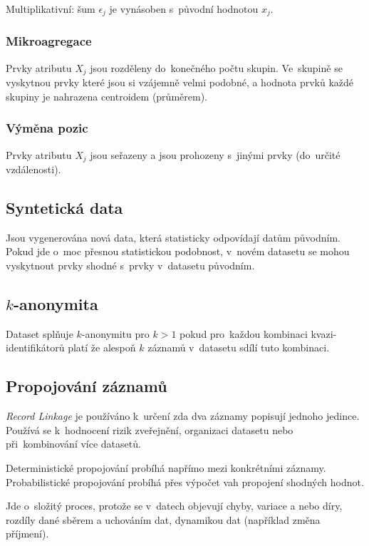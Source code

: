 Multiplikativní: šum $\epsilon_j$ je vynásoben s~původní hodnotou $x_j$.


\subsubsection*{Mikroagregace}

Prvky atributu $X_j$ jsou rozděleny do~konečného počtu skupin.
Ve~skupině se vyskytnou prvky které jsou si vzájemně velmi podobné, a hodnota prvků každé skupiny je nahrazena centroidem (průměrem).


\subsubsection*{Výměna pozic}


Prvky atributu $X_j$ jsou seřazeny a jsou prohozeny s~jinými prvky (do~určité vzdálenosti).


\subsection{Syntetická data}

Jsou vygenerována nová data, která statisticky odpovídají datům původním.
Pokud jde o~moc přesnou statistickou podobnost, v~novém datasetu se mohou vyskytnout prvky shodné s~prvky v~datasetu původním.


\subsection{$k$-anonymita}

Dataset splňuje $k$-anonymitu pro $k > 1$ pokud pro~každou kombinaci kvazi-identifikátorů platí že alespoň $k$ záznamů v~datasetu sdílí tuto kombinaci.


\subsection{Propojování záznamů}

\emph{Record Linkage} je používáno k~určení zda dva záznamy popisují jednoho jedince.
Používá se k~hodnocení rizik zveřejnění, organizaci datasetu nebo při~kombinování více datasetů.

Deterministické propojování probíhá napřímo mezi konkrétními záznamy.
Probabilistické propojování probíhá přes výpočet vah propojení shodných hodnot.

Jde o~složitý proces, protože se v~datech objevují
chyby, variace a nebo díry,
rozdíly dané sběrem a uchováním dat,
dynamikou dat (například změna příjmení).
